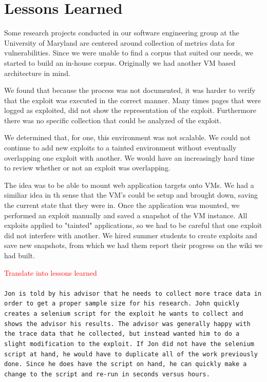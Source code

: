 \documentclass[letterpaper,twocolumn,10pt]{article}
\begin{document}
\section{Lessons Learned}

Some research projects conducted in our software engineering group at the University of Maryland are centered around collection of metrics data for vulnerabilities.  Since we were unable to find a corpus that suited our needs, we started to build an in-house corpus.  Originally we had another VM based architecture in mind. \par

We found that because the process was not documented, it was harder to verify that the exploit was executed in the correct manner.  Many times pages that were logged as exploited, did not show the representation of the exploit.  Furthermore there was no specific collection that could be analyzed of the exploit.\par

We determined that, for one, this environment was not scalable.  We could not continue to add new exploits to a tainted environment without eventually overlapping one exploit with another.  We would have an increasingly hard time to review whether or not an exploit was overlapping.\par

The idea was to be able to mount web application targets onto VMs.  We had a similiar idea in th sense that the VM's could be setup and brought down, saving the current state that they were in.  Once the application was mounted, we performed an exploit manually and saved a snapshot of the VM instance.  All exploits applied to "tainted" applications, so we had to be careful that one exploit did not interfere with another.  We hired summer students to create exploits and save new snapshots, from which we had them report their progress on the wiki we had built.\par

\textcolor{red}{ Translate into lessons learned }
\\\\
{\tt Jon is told by his advisor that he needs to collect more trace data in order to get a proper sample size for his research.  John quickly creates a selenium script for the exploit he wants to collect and shows the advisor his results.  The advisor was generally happy with the trace data that he collected, but instead wanted him to do a slight modification to the exploit.  If Jon did not have the selenium script at hand, he would have to duplicate all of the work previously done.  Since he does have the script on hand, he can quickly make a change to the script and re-run in seconds versus hours.}
\\\\
\end{document}
